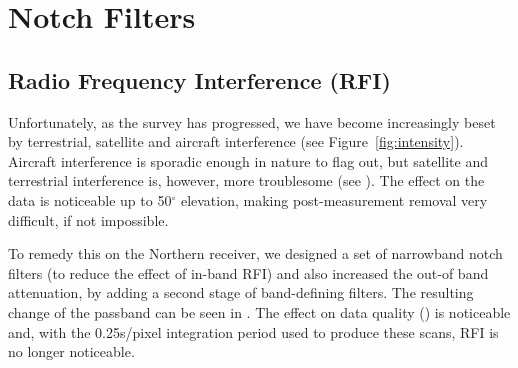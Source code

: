 \section{Notch Filters}
\subsection{Radio Frequency Interference (RFI)}

Unfortunately, as the survey has progressed, we have become increasingly beset
by terrestrial, satellite and aircraft interference (see Figure~\ref{fig:intensity}). Aircraft interference is
sporadic enough in nature to flag out, but satellite and terrestrial interference is, however, more troublesome (see ). The effect on the data is noticeable up to 50$^{\circ}$ elevation, making post-measurement removal very difficult, if not impossible.

 To remedy this on the Northern receiver, we designed a set of narrowband notch filters (to reduce the effect of in-band RFI) and also increased the out-of band attenuation, by adding a second stage of band-defining filters. The resulting change of the passband can be seen in . The effect on data quality () is noticeable and, with the 0.25s/pixel integration period used to produce these scans, RFI is no longer noticeable.

